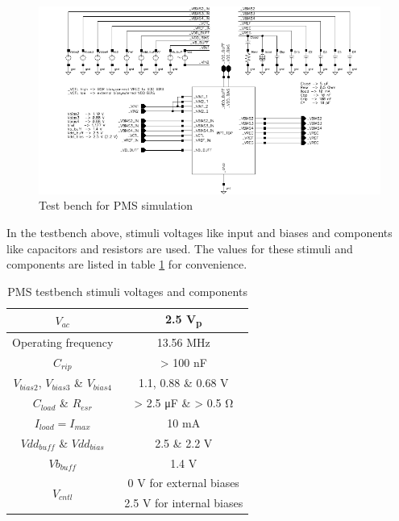 \documentclass[12pt,a4paper,UKenglish]{article}
\begin{document}
\vspace{5mm}

\begin{figure} [H]
  \centering
  \includegraphics[width=\textwidth]{img/wpt_top_testbench.pdf} 
 \caption{Test bench for PMS simulation } 
\label{fig:wpt_top_testbench} 
\end{figure}

In the testbench above, stimuli voltages like input and biases and components like capacitors and resistors are used. The values for these stimuli and components are listed in table \ref{tab:pms_stimuli} for convenience.

\begin{table}[!htbp]
\caption{PMS testbench stimuli voltages and components} 
\begin{center}
\begin{tabular}{c|c}
\hline \hline
$V_{ac} $			& 2.5 \si{\volt}\textsubscript{p} \\ \hline
Operating frequency	& 13.56 \si{\mega\hertz}	\\ \hline
$C_{rip}$ 		  	& > 100 \si{\nano\farad}	\\ \hline
$V_{bias2}$, $V_{bias3}$ \& $V_{bias4}$ & 1.1, 0.88 \& 0.68 \si{\volt} \\ \hline
$C_{load}$ \& $R_{esr}$ & > 2.5 \si{\micro\farad} \& > 0.5 \si{\ohm} \\ \hline
$I_{load} = I_{max}$ & 10 \si{\milli\ampere} \\ \hline
$Vdd_{buff}$ \& $Vdd_{bias}$ & 2.5 \& 2.2 \si{\volt} \\ \hline
$Vb_{buff}$ & 1.4 V \\ \hline
\multirow{2}{*}{$V_{cntl}$} 
			& 0 \si{\volt} for external biases \\ \cline{2-2}
			& 2.5 \si{\volt} for internal biases  \\ 
\hline \hline
\end{tabular}
\end{center}
\label{tab:pms_stimuli}
\end{table}%
\end{document}
